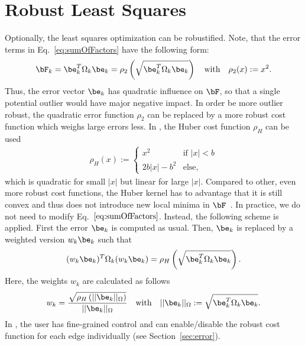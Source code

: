 \documentclass[a4paper]{article}
\begin{document}
\section{Robust Least Squares\label{sec:robust_kernel}}
Optionally, the least squares optimization can be robustified.
Note, that the error terms in Eq.~\ref{eq:sumOfFactors}  have the following form:
\begin{eqnarray}
\bF_k = \be_k^T\Omega_k \be_k = \rho_2\left(\sqrt{\be_k^T\Omega_k \be_k}\right) \quad \text{with} \quad \rho_2(x):=x^2.
\end{eqnarray}
Thus, the error vector $\be_k$ has quadratic influence on $\bF$,
so that a single potential outlier would have major negative impact.
In order be more outlier robust, the quadratic error function $\rho_2$
can be replaced by a more robust cost function which weighs large errors less.
In \gopt, the Huber cost function $\rho_H$ can be used
\begin{eqnarray}
\rho_H(x) := \begin{cases}
                 x^2         & \text{if } |x|<b\\
                  2b |x| - b^2          & \text{else},
   \end{cases}
\end{eqnarray}
which is quadratic for small $|x|$ but linear for large $|x|$. Compared to other,
even more robust cost functions, the Huber kernel has to advantage that it is
still convex and thus does not introduce new local minima in $\bF$~\cite[pp.616]{Hartley:Zisserman:Book2004}.
In practice, we do not need to modify Eq.~$\ref{eq:sumOfFactors}$. Instead, the following scheme
is applied. First the  error $\be_k$ is computed as usual. Then, $\be_k$ is replaced by
a weighted version $w_k\be_k$ such that
\begin{eqnarray}
(w_k\be_k)^T\Omega_k (w_k\be_k) = \rho_H\left(\sqrt{\be_k^T\Omega_k \be_k}\right).
\end{eqnarray}
Here, the weights $w_k$ are calculated as follows
\begin{eqnarray}
w_k = \frac{\sqrt{\rho_H\left(||\be_k||_\Omega \right)}}{||\be_k||_\Omega } \quad \text{with} \quad ||\be_k||_\Omega := \sqrt{\be_k^T\Omega_k \be_k}.
\end{eqnarray}
In \gopt, the user has fine-grained control and can enable/disable the robust cost function for each edge individually (see Section~\ref{sec:error}).
\end{document}

